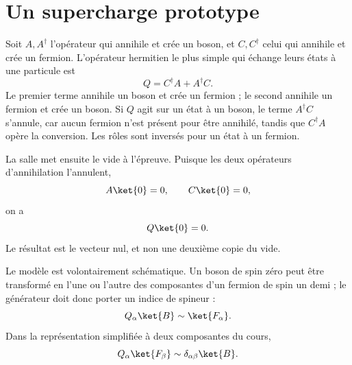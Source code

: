 \section{Un supercharge prototype}

Soit \(A,A^\dagger\) l’opérateur qui annihile et crée un boson, et \(C,C^\dagger\) celui qui annihile et crée un fermion. L’opérateur hermitien le plus simple qui échange leurs états à une particule est
\begin{equation}
Q=C^\dagger A+A^\dagger C.
\end{equation}
Le premier terme annihile un boson et crée un fermion ; le second annihile un fermion et crée un boson. Si \(Q\) agit sur un état à un boson, le terme \(A^\dagger C\) s’annule, car aucun fermion n’est présent pour être annihilé, tandis que \(C^\dagger A\) opère la conversion. Les rôles sont inversés pour un état à un fermion.

\begin{classroomqa}
\end{classroomqa}

La salle met ensuite le vide à l’épreuve. Puisque les deux opérateurs d’annihilation l’annulent,
\begin{equation}
A\ket{0}=0,\qquad C\ket{0}=0,
\end{equation}
on a
\begin{equation}
Q\ket{0}=0.
\end{equation}
Le résultat est le vecteur nul, et non une deuxième copie du vide.

Le modèle est volontairement schématique. Un boson de spin zéro peut être transformé en l’une ou l’autre des composantes d’un fermion de spin un demi ; le générateur doit donc porter un indice de spineur :
\begin{equation}
Q_\alpha\ket{B}\sim\ket{F_\alpha}.
\end{equation}
Dans la représentation simplifiée à deux composantes du cours,
\begin{equation}
Q_\alpha\ket{F_\beta}\sim\delta_{\alpha\beta}\ket{B}.
\end{equation}

